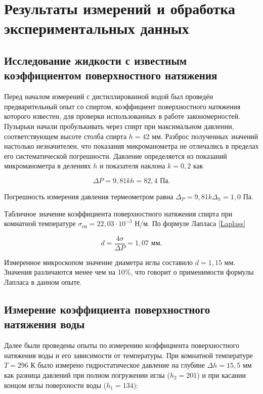 \documentclass[a4paper,12pt]{article} %
\begin{document}
\section{Результаты измерений и обработка экспериментальных данных}

\subsection{Исследование жидкости с известным коэффициентом поверхностного натяжения}

Перед началом измерений с дистиллированной водой был проведён предварительный опыт со спиртом, коэффициент поверхностного натяжения которого известен, для проверки использованных в работе закономерностей. Пузырьки начали пробулькивать через спирт при максимальном давлении, соответствующем высоте столба спирта $h = 42$ мм. Разброс полученных значений настолько незначителен, что показания микроманометра не отличались в пределах его систематической погрешности. Давление определяется из показаний микроманометра в делениях $h$ и показателя наклона $k = 0,2$ как

\begin{equation}
    \Delta P = 9,81kh = 82,4 \text{ Па}.
    \label{micromano}
\end{equation}

Погрешность измерения давления термеометром равна $\Delta_P = 9,81k\Delta_h = 1,0$ Па.

Табличное значение коэффициента поверхностного натяжения спирта при комнатной температуре $\sigma_\text{сп} = 22,03 \cdot 10^{-3}$ Н/м. По формуле Лапласа \eqref{Laplass}
 
\begin{equation}
    d = \frac{4\sigma}{\Delta P} = 1,07 \text{ мм}.
\end{equation}

Измеренное микроскопом значение диаметра иглы составило $d = 1,15$ мм. Значения различаются менее чем на 10\%, что говорит о применимости формулы Лапласа в данном опыте.

\subsection{Измерение коэффициента поверхностного натяжения воды}

Далее были проведены опыты по измерению коэффициента поверхностного натяжения воды и его зависимости от температуры. При комнатной температуре $T = 296$ К было измерено гидростатическое давление на глубине $\Delta h = 15,5$ мм как разница давлений при полном погружении иглы ($h_2 = 201$) и при касании концом иглы поверхности воды ($h_1 = 134$):
\end{document}
